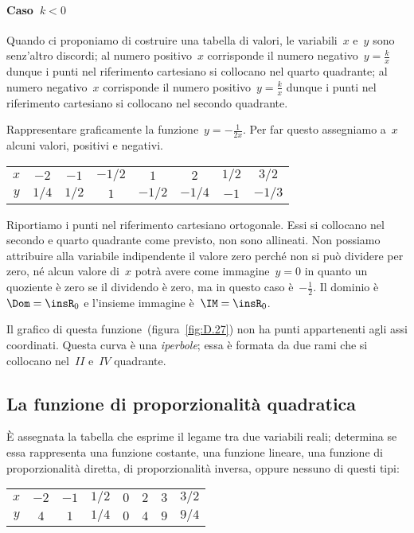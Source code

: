 \paragraph{Caso~$k<0$} Quando ci proponiamo di costruire una tabella di valori, le variabili~$x$ e~$y$ sono senz'altro discordi;
al numero positivo~$x$ corrisponde il numero negativo~$y=\frac{k}{x}$ dunque i punti nel riferimento cartesiano si
collocano nel quarto quadrante; al numero negativo~$x$ corrisponde il numero positivo~$y=\frac{k}{x}$ dunque i
punti nel riferimento cartesiano si collocano nel secondo quadrante.
\begin{exrig}
 \begin{esempio}
Rappresentare graficamente la funzione~$y=-\frac{1}{2x}$.
Per far questo assegniamo a~$x$ alcuni valori, positivi e negativi.
\begin{center}
 \begin{tabular}{cccccccc}
 \toprule
 $x$ & $-2$ & $-1$ & $-1/2$ & $1$ & $2$& $1/2$ & $3/2$\\
 $y$ & $1/4$ & $1/2$ & $1$ & $-1/2$ & $-1/4$& $-1$ & $-1/3$\\
 \bottomrule
 \end{tabular}
\end{center}
Riportiamo i punti nel riferimento cartesiano ortogonale. Essi si collocano nel secondo e quarto quadrante come previsto,
non sono allineati. Non possiamo attribuire alla variabile indipendente il valore zero perché non si può dividere per zero,
né alcun valore di~$x$ potrà avere come immagine~$y=0$ in quanto un quoziente è zero se il dividendo è zero, ma
in questo caso è~$-\frac{1}{2}$.
Il dominio è~$\Dom=\insR_{0}$ e l'insieme immagine è~$\IM=\insR_{0}$. 

Il grafico di questa funzione~(figura~\ref{fig:D.27}) non ha punti appartenenti agli assi coordinati.
Questa curva è una \emph{iperbole}; essa è formata da due rami che si collocano nel~$II$ e~$IV$ quadrante.
 \end{esempio}
\end{exrig}

\ovalbox{\risolvii \ref{ese:D.51}, \ref{ese:D.52}}

\subsection{La funzione di proporzionalità quadratica}
È assegnata la tabella che esprime il legame tra due variabili reali; determina se essa rappresenta una funzione costante,
una funzione lineare, una funzione di proporzionalità diretta, di proporzionalità inversa, oppure nessuno di questi tipi:
\begin{center}
 \begin{tabular}{cccccccc}
 \toprule
 $x$ & $-2$ & $-1$ & $1/2$ & $0$ & $2$& $3$ & $3/2$\\
 $y$ & $4$ & $1$ & $1/4$ & $0$ & $4$& $9$ & $9/4$\\
 \bottomrule
 \end{tabular}
\end{center}

